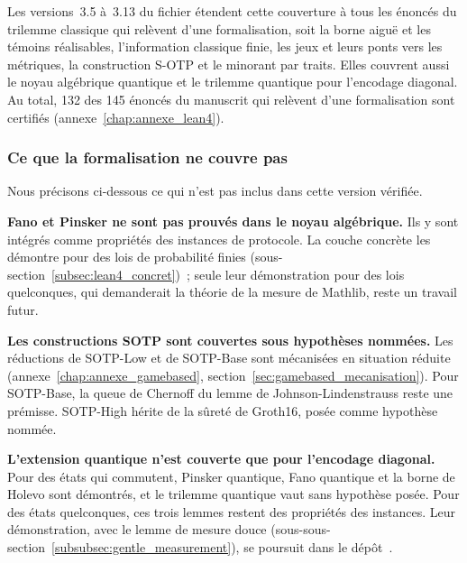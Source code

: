 \begin{sloppypar}
Les versions~3.5 \`a~3.13 du fichier \'etendent cette couverture \`a tous les \'enonc\'es du
trilemme classique qui rel\`event d'une formalisation, soit la borne aigu\"e et les t\'emoins
r\'ealisables, l'information classique finie, les jeux et leurs ponts vers les m\'etriques, la
construction S-OTP et le minorant par traits. Elles couvrent aussi le noyau alg\'ebrique quantique
et le trilemme quantique pour l'encodage diagonal. Au total, 132 des 145 \'enonc\'es du manuscrit
qui rel\`event d'une formalisation sont certifi\'es (annexe~\ref{chap:annexe_lean4}).

\subsubsection{Ce que la formalisation ne couvre pas}
\label{subsubsec:ce_que_ne_couvre_pas}

Nous pr\'ecisons ci-dessous ce qui
n'est pas inclus dans cette version v\'erifi\'ee.

\textbf{Fano et Pinsker ne sont pas prouv\'es dans le noyau
alg\'ebrique.} Ils y sont int\'egr\'es comme
propri\'et\'es des instances de protocole. La couche concr\`ete les d\'emontre pour des
lois de probabilit\'e finies (sous-section~\ref{subsec:lean4_concret})~; seule leur
d\'emonstration pour des lois quelconques, qui demanderait la th\'eorie de la mesure de
Mathlib, reste un travail futur.

\textbf{Les constructions SOTP sont couvertes sous hypoth\`eses nomm\'ees.}
Les r\'eductions de SOTP-Low et de SOTP-Base sont m\'ecanis\'ees en situation r\'eduite
(annexe~\ref{chap:annexe_gamebased}, section~\ref{sec:gamebased_mecanisation}). Pour SOTP-Base,
la queue de Chernoff du lemme de Johnson-Lindenstrauss reste une pr\'emisse. SOTP-High h\'erite
de la s\^uret\'e de Groth16, pos\'ee comme hypoth\`ese nomm\'ee.

\textbf{L'extension quantique n'est couverte que pour l'encodage diagonal.}
Pour des \'etats qui commutent, Pinsker quantique, Fano quantique et la borne de Holevo sont
d\'emontr\'es, et le trilemme quantique vaut sans hypoth\`ese pos\'ee. Pour des \'etats
quelconques, ces trois lemmes restent des propri\'et\'es des instances. Leur d\'emonstration, avec
le lemme de mesure douce (sous-sous-section~\ref{subsubsec:gentle_measurement}), se poursuit
dans le d\'ep\^ot~\cite{CROTrilemmaDepot}.
\end{sloppypar}

